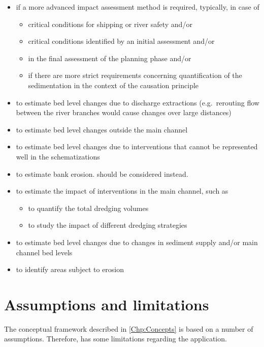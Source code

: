 \begin{itemize}
\item if a more advanced impact assessment method is required, typically, in case of
\begin{itemize}
\item critical conditions for shipping or river safety and/or
\item critical conditions identified by an initial \dfmi assessment and/or
\item in the final assessment of the planning phase and/or
\item if there are more strict requirements concerning quantification of the sedimentation in the context of the causation principle
\end{itemize}
\item to estimate bed level changes due to discharge extractions (e.g.~rerouting flow between the river branches would cause changes over large distances)
\item to estimate bed level changes outside the main channel
\item to estimate bed level changes due to interventions that cannot be represented well in the \dflowfm schematizations
\item to estimate bank erosion. \dfastbe should be considered instead.
\item to estimate the impact of interventions in the main channel, such as
\begin{itemize}
\item to quantify the total dredging volumes
\item to study the impact of different dredging strategies
\end{itemize}
\item to estimate bed level changes due to changes in sediment supply and/or main channel bed levels
\item to identify areas subject to erosion
\end{itemize}


\section{Assumptions and limitations}\label{Sec:Limitations}

The conceptual framework described in \autoref{Chp:Concepts} is based on a number of assumptions.
Therefore, \dfmi has some limitations regarding the application.


